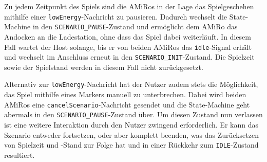 Zu jedem Zeitpunkt des Spiels sind die AMiRos in der Lage das Spielgeschehen mithilfe einer \texttt{lowEnergy}-Nachricht zu pausieren. Dadurch wechselt die State-Machine in den \texttt{SCENARIO\_PAUSE}-Zustand und ermöglicht dem AMiRo das Andocken an die Ladestation, ohne dass das Spiel dabei weiterläuft. In diesem Fall wartet der Host solange, bis er von beiden AMiRos das \texttt{idle}-Signal erhält und wechselt im Anschluss erneut in den \texttt{SCENARIO\_INIT}-Zustand. Die Spielzeit sowie der Spielstand werden in diesem Fall nicht zurückgesetzt.

Alternativ zur \texttt{lowEnergy}-Nachricht hat der Nutzer zudem stets die Möglichkeit, das Spiel mithilfe eines Markers manuell zu unterbrechen. Dabei wird beiden AMiRos eine \texttt{cancelScenario}-Nachricht gesendet und die State-Machine geht abermals in den \texttt{SCENARIO\_PAUSE}-Zustand über. Um diesen Zustand nun verlassen ist eine weitere Interaktion durch den Nutzer zwingend erforderlich. Er kann das Szenario entweder fortsetzen, oder aber komplett beenden, was das Zurücksetzen von Spielzeit und -Stand zur Folge hat und in einer Rückkehr zum \texttt{IDLE}-Zustand resultiert.


